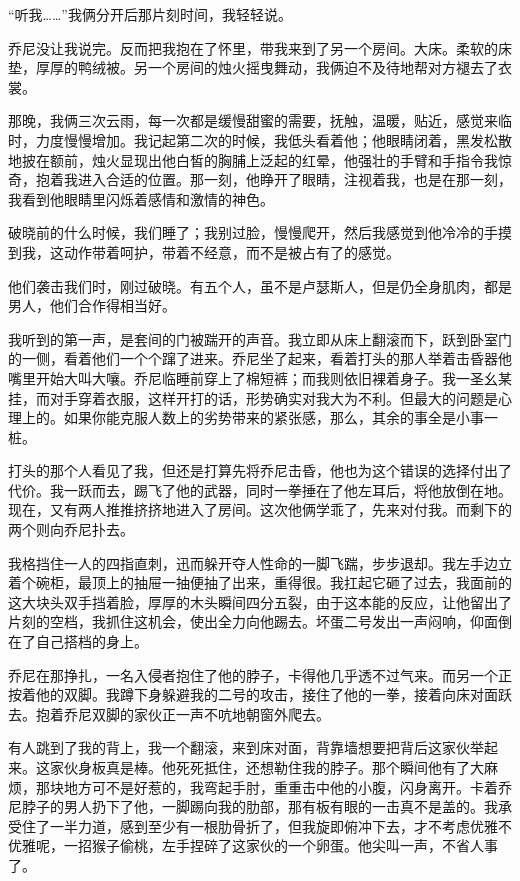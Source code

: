 \documentclass[AutoFakeBold=true]{book}
\begin{document}
``听我……''我俩分开后那片刻时间，我轻轻说。

乔尼没让我说完。反而把我抱在了怀里，带我来到了另一个房间。大床。柔软的床垫，厚厚的鸭绒被。另一个房间的烛火摇曳舞动，我俩迫不及待地帮对方褪去了衣裳。

那晚，我俩三次云雨，每一次都是缓慢甜蜜的需要，抚触，温暖，贴近，感觉来临时，力度慢慢增加。我记起第二次的时候，我低头看着他；他眼睛闭着，黑发松散地披在额前，烛火显现出他白皙的胸脯上泛起的红晕，他强壮的手臂和手指令我惊奇，抱着我进入合适的位置。那一刻，他睁开了眼睛，注视着我，也是在那一刻，我看到他眼睛里闪烁着感情和激情的神色。

破晓前的什么时候，我们睡了；我别过脸，慢慢爬开，然后我感觉到他冷冷的手摸到我，这动作带着呵护，带着不经意，而不是被占有了的感觉。

\vspace*{1em}

他们袭击我们时，刚过破晓。有五个人，虽不是卢瑟斯人，但是仍全身肌肉，都是男人，他们合作得相当好。

我听到的第一声，是套间的门被踹开的声音。我立即从床上翻滚而下，跃到卧室门的一侧，看着他们一个个蹿了进来。乔尼坐了起来，看着打头的那人举着击昏器他嘴里开始大叫大嚷。乔尼临睡前穿上了棉短裤；而我则依旧裸着身子。我一圣幺某挂，而对手穿着衣服，这样开打的话，形势确实对我大为不利。但最大的问题是心理上的。如果你能克服人数上的劣势带来的紧张感，那么，其余的事全是小事一桩。

打头的那个人看见了我，但还是打算先将乔尼击昏，他也为这个错误的选择付出了代价。我一跃而去，踢飞了他的武器，同时一拳捶在了他左耳后，将他放倒在地。现在，又有两人推推挤挤地进入了房间。这次他俩学乖了，先来对付我。而剩下的两个则向乔尼扑去。

我格挡住一人的四指直刺，迅而躲开夺人性命的一脚飞踹，步步退却。我左手边立着个碗柜，最顶上的抽屉一抽便抽了出来，重得很。我扛起它砸了过去，我面前的这大块头双手挡着脸，厚厚的木头瞬间四分五裂，由于这本能的反应，让他留出了片刻的空档，我抓住这机会，使出全力向他踢去。坏蛋二号发出一声闷响，仰面倒在了自己搭档的身上。

乔尼在那挣扎，一名入侵者抱住了他的脖子，卡得他几乎透不过气来。而另一个正按着他的双脚。我蹲下身躲避我的二号的攻击，接住了他的一拳，接着向床对面跃去。抱着乔尼双脚的家伙正一声不吭地朝窗外爬去。

有人跳到了我的背上，我一个翻滚，来到床对面，背靠墙想要把背后这家伙举起来。这家伙身板真是棒。他死死抵住，还想勒住我的脖子。那个瞬间他有了大麻烦，那块地方可不是好惹的，我弯起手肘，重重击中他的小腹，闪身离开。卡着乔尼脖子的男人扔下了他，一脚踢向我的肋部，那有板有眼的一击真不是盖的。我承受住了一半力道，感到至少有一根肋骨折了，但我旋即俯冲下去，才不考虑优雅不优雅呢，一招猴子偷桃，左手捏碎了这家伙的一个卵蛋。他尖叫一声，不省人事了。
\end{document}
